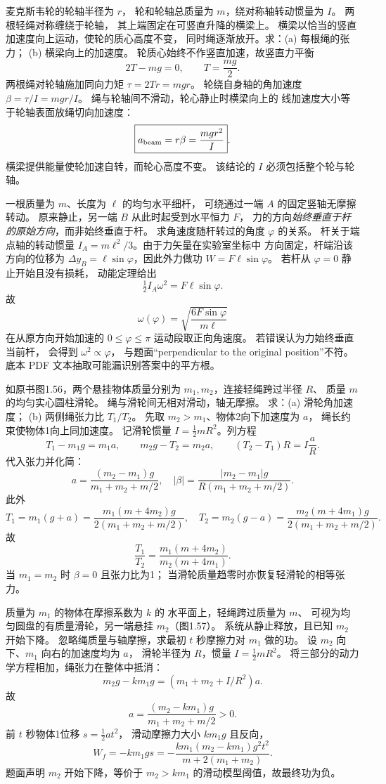 麦克斯韦轮的轮轴半径为 $r$，
轮和轮轴总质量为 $m$，绕对称轴转动惯量为 $I$。
两根轻绳对称缠绕于轮轴，
其上端固定在可竖直升降的横梁上。
横梁以恰当的竖直加速度向上运动，使轮的质心高度不变，
同时绳逐渐放开。求：(a) 每根绳的张力；
(b) 横梁向上的加速度。
\exsolution
轮质心始终不作竖直加速，故竖直力平衡
\[
2T-mg=0,\qquad
\boxed{T=\frac{mg}{2}}.
\]
两根绳对轮轴施加同向力矩
$\tau=2Tr= mgr$。
轮绕自身轴的角加速度
$\beta=\tau/I=mgr/I$。
绳与轮轴间不滑动，轮心静止时横梁向上的
线加速度大小等于轮轴表面放绳切向加速度：
\[
\boxed{a_{\rm beam}=r\beta=\frac{mgr^2}{I}}.
\]
\excheck 横梁提供能量使轮加速自转，而轮心高度不变。
该结论的 $I$ 必须包括整个轮与轮轴。

一根质量为 $m$、长度为 $\ell$ 的均匀水平细杆，
可绕通过一端 $A$ 的固定竖轴无摩擦转动。
原来静止，另一端 $B$ 从此时起受到水平恒力 $F$，
力的方向\emph{始终垂直于杆的原始方向}，而非始终垂直于杆。
求角速度随杆转过的角度 $\varphi$ 的关系。
\exsolution
杆关于端点轴的转动惯量
$I_A=m\ell^2/3$。由于力矢量在实验室坐标中
方向固定，杆端沿该方向的位移为
$\Delta y_B=\ell\sin\varphi$，因此外力做功
$W=F\ell\sin\varphi$。
若杆从 $\varphi=0$ 静止开始且没有损耗，
动能定理给出
\[
\tfrac12I_A\omega^2=F\ell\sin\varphi.
\]
故
\[
\boxed{\omega(\varphi)=
\sqrt{\frac{6F\sin\varphi}{m\ell}}}
\]
在从原方向开始加速的 $0\le\varphi\le\pi$
运动段取正向角速度。
\excheck 若错误认为力始终垂直当前杆，
会得到 $\omega^2\propto\varphi$，
与题面“perpendicular to the original position”不符。
底本 PDF 文本抽取可能漏识别答案中的平方根。

如原书图1.56，两个悬挂物体质量分别为
$m_1,m_2$，连接轻绳跨过半径 $R$、
质量 $m$ 的均匀实心圆柱滑轮。
绳与滑轮间无相对滑动，轴无摩擦。
求：(a) 滑轮角加速度；
(b) 两侧绳张力比 $T_1/T_2$。
\exsolution
先取 $m_2>m_1$、物体2向下加速度为 $a$，
绳长约束使物体1向上同加速度。
记滑轮惯量 $I=\frac12mR^2$。列方程
\[
T_1-m_1g=m_1a,\qquad
m_2g-T_2=m_2a,\qquad
(T_2-T_1)R=I\frac aR.
\]
代入张力并化简：
\[
a=\frac{(m_2-m_1)g}{m_1+m_2+m/2},
\quad
\boxed{|\beta|=\frac{|m_2-m_1|g}
{R(m_1+m_2+m/2)}}.
\]
此外
\[
T_1=m_1(g+a)
=\frac{m_1(m+4m_2)g}{2(m_1+m_2+m/2)},
\quad
T_2=m_2(g-a)
=\frac{m_2(m+4m_1)g}{2(m_1+m_2+m/2)}.
\]
故
\[
\boxed{\frac{T_1}{T_2}
=\frac{m_1(m+4m_2)}{m_2(m+4m_1)}}.
\]
\excheck 当 $m_1=m_2$ 时 $\beta=0$ 且张力比为1；
当滑轮质量趋零时亦恢复轻滑轮的相等张力。

质量为 $m_1$ 的物体在摩擦系数为 $k$ 的
水平面上，轻绳跨过质量为 $m$、
可视为均匀圆盘的有质量滑轮，另一端悬挂 $m_2$（图1.57）。
系统从静止释放，且已知 $m_2$ 开始下降。
忽略绳质量与轴摩擦，求最初 $t$ 秒摩擦力对 $m_1$ 做的功。
\exsolution
设 $m_2$ 向下、$m_1$ 向右的加速度均为 $a$，
滑轮半径为 $R$，惯量 $I=\frac12mR^2$。
将三部分的动力学方程相加，绳张力在整体中抵消：
\[
m_2g-km_1g=(m_1+m_2+I/R^2)a.
\]
故
\[
a=\frac{(m_2-km_1)g}{m_1+m_2+m/2}>0.
\]
前 $t$ 秒物体1位移 $s=\frac12at^2$，
滑动摩擦力大小 $km_1g$ 且反向，
\[
W_f=-km_1gs
=\boxed{-\frac{k m_1(m_2-km_1)g^2t^2}
{m+2(m_1+m_2)}}.
\]
\excheck 题面声明 $m_2$ 开始下降，等价于
$ m_2>km_1$ 的滑动模型阈值，故最终功为负。

